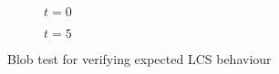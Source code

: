 \begin{figure}[htpb]
\centering
    \begin{subfigure}[b]{0.475\textwidth}
        \centering
        \caption[]{{\small $t=0$}}
        \label{fig:u0_dom_err_dp54}
    \end{subfigure}
    \begin{subfigure}[b]{0.475\textwidth}
        \centering
        \caption[]{{\small $t=5$}}
        \label{fig:u0_dom_err_dp87}
    \end{subfigure}
\caption[Veni, vidi, Aviici]{Blob test for verifying expected LCS behaviour}
    \label{fig:u0_dom_errs}
\end{figure}

